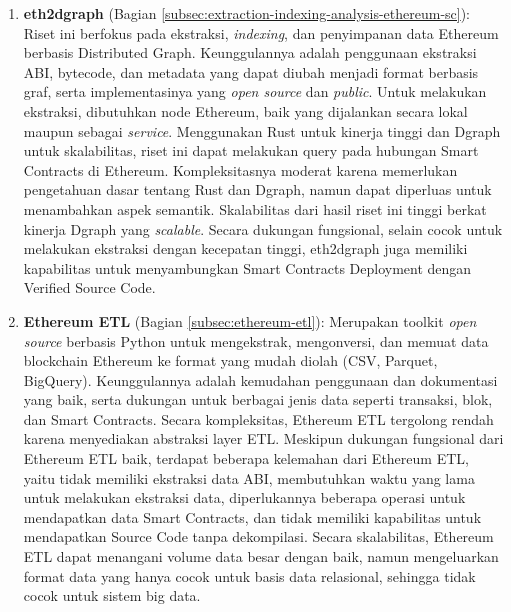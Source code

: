 \begin{enumerate}
    \item \textbf{eth2dgraph} \parencite{aimar2023extraction} (Bagian \ref{subsec:extraction-indexing-analysis-ethereum-sc}): Riset ini berfokus pada ekstraksi, \textit{indexing}, dan penyimpanan data Ethereum berbasis Distributed Graph. Keunggulannya adalah penggunaan ekstraksi ABI, bytecode, dan metadata yang dapat diubah menjadi format berbasis graf, serta implementasinya yang \textit{open source} dan \textit{public}. Untuk melakukan ekstraksi, dibutuhkan node Ethereum, baik yang dijalankan secara lokal maupun sebagai \textit{service}. Menggunakan Rust untuk kinerja tinggi dan Dgraph untuk skalabilitas, riset ini dapat melakukan query pada hubungan Smart Contracts di Ethereum. Kompleksitasnya moderat karena memerlukan pengetahuan dasar tentang Rust dan Dgraph, namun dapat diperluas untuk menambahkan aspek semantik. Skalabilitas dari hasil riset ini tinggi berkat kinerja Dgraph yang \textit{scalable}. Secara dukungan fungsional, selain cocok untuk melakukan ekstraksi dengan kecepatan tinggi, eth2dgraph juga memiliki kapabilitas untuk menyambungkan Smart Contracts Deployment dengan Verified Source Code.
    
    \item \textbf{Ethereum ETL} \parencite{ethereum_etl} (Bagian \ref{subsec:ethereum-etl}): Merupakan toolkit \textit{open source} berbasis Python untuk mengekstrak, mengonversi, dan memuat data blockchain Ethereum ke format yang mudah diolah (CSV, Parquet, BigQuery). Keunggulannya adalah kemudahan penggunaan dan dokumentasi yang baik, serta dukungan untuk berbagai jenis data seperti transaksi, blok, dan Smart Contracts. Secara kompleksitas, Ethereum ETL tergolong rendah karena menyediakan abstraksi layer ETL. Meskipun dukungan fungsional dari Ethereum ETL baik, terdapat beberapa kelemahan dari Ethereum ETL, yaitu tidak memiliki ekstraksi data ABI, membutuhkan waktu yang lama untuk melakukan ekstraksi data, diperlukannya beberapa operasi untuk mendapatkan data Smart Contracts, dan tidak memiliki kapabilitas untuk mendapatkan Source Code tanpa dekompilasi. Secara skalabilitas, Ethereum ETL dapat menangani volume data besar dengan baik, namun mengeluarkan format data yang hanya cocok untuk basis data relasional, sehingga tidak cocok untuk sistem big data. 
    

\end{enumerate}
